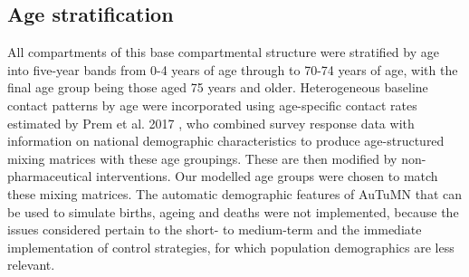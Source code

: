 \subsection{Age stratification}
All compartments of this base compartmental structure were stratified by age into five-year bands from 0-4 years of age through to 70-74 years of age, with the final age group being those aged 75 years and older. Heterogeneous baseline contact patterns by age were incorporated using age-specific contact rates estimated by Prem et al. 2017 \cite{RN56}, who combined survey response data with information on national demographic characteristics to produce age-structured mixing matrices with these age groupings. These are then modified by non-pharmaceutical interventions. Our modelled age groups were chosen to match these mixing matrices. The automatic demographic features of AuTuMN that can be used to simulate births, ageing and deaths were not implemented, because the issues considered pertain to the short- to medium-term and the immediate implementation of control strategies, for which population demographics are less relevant.
